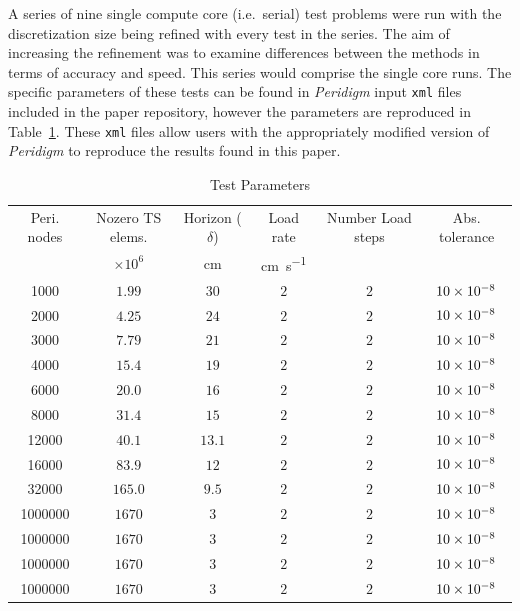 \documentclass[preprint,12pt]{elsarticle}
\begin{document}
A series of nine single compute core (i.e.\ serial) test problems were run with the discretization size being refined with every test in the series. The aim of increasing the refinement was to examine differences between the methods in terms of accuracy and speed. This series would comprise the single core runs.   The specific parameters of these tests can be found in \emph{Peridigm} input {\tt xml} files included in the paper repository, however the parameters are reproduced in Table~\ref{tab:TestParams}. These {\tt xml} files allow users with the appropriately modified version of \emph{Peridigm} to reproduce the results found in this paper.
%
\begin{table}[!tbp]    
  \scriptsize
  \centering
        \caption{Test Parameters} \label{tab:TestParams}   
       \begin{tabular}{c c c c c c}
         \toprule
         Peri. nodes & Nozero TS elems. & Horizon ($\delta$) & Load rate & Number Load steps & Abs. tolerance \\ 
                     & $\times 10^6$    & \si{\centi\meter}& \si{\centi\meter\per\second} &   &     \\
        \midrule
        1000 & $1.99$             & $30$   & $2$ & $2$ & $\num{10E-8}$ \\
        2000 & $4.25$             & $24$  & $2$ & $2$ & $\num{10E-8}$ \\
        3000 & $7.79$             & $21$  & $2$ & $2$ & $\num{10E-8}$ \\
        4000 & $15.4$             & $19$  & $2$ & $2$ & $\num{10E-8}$ \\
        6000 & $20.0$             & $16$  & $2$ & $2$ & $\num{10E-8}$ \\
        8000 & $31.4$             & $15$  & $2$ & $2$ & $\num{10E-8}$ \\
        12000 & $40.1$            & $13.1$ & $2$ & $2$ & $\num{10E-8}$ \\
        16000 & $83.9$            & $12$  & $2$ & $2$ & $\num{10E-8}$ \\
        32000 & $165.0$           & $9.5$ & $2$ & $2$ & $\num{10E-8}$ \\
        1000000 & $1670$          & $3$  & $2$ & $2$ & $\num{10E-8}$ \\
        1000000 & $1670$          & $3$  & $2$ & $2$ & $\num{10E-8}$ \\
        1000000 & $1670$          & $3$  & $2$ & $2$ & $\num{10E-8}$ \\
        1000000 & $1670$          & $3$  & $2$ & $2$ & $\num{10E-8}$ \\
        \bottomrule
    \end{tabular}
\end{table}
\end{document}
